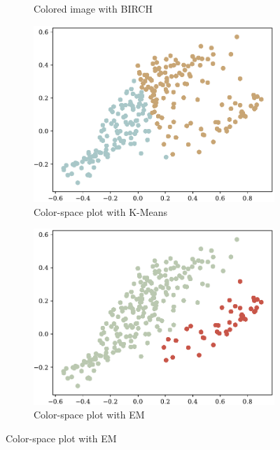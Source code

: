 \documentclass[sigconf,authorversion]{acmart}
\begin{document}
\begin{figure}[hbtp]
\begin{subfigure}[b]{0.25\textwidth}
      \caption{Colored image with BIRCH}
      \label{subfig:baboon_hsv_birch}
  \end{subfigure}
  \begin{subfigure}[b]{0.25\textwidth}
      \includegraphics[width=\textwidth]{../outputs/baboon_2_hsv_plot_kmeans.pdf}
      \caption{Color-space plot with K-Means}
      \label{subfig:p_baboon_hsv_kmeans}
  \end{subfigure}
  \hspace{0.05\textwidth}
  \begin{subfigure}[b]{0.25\textwidth}
      \includegraphics[width=\textwidth]{../outputs/baboon_2_hsv_plot_gmm.pdf}
      \caption{Color-space plot with EM}
      \label{subfig:p_baboon_hsv_gmm}
  \end{subfigure}

\end{figure}
\end{document}
